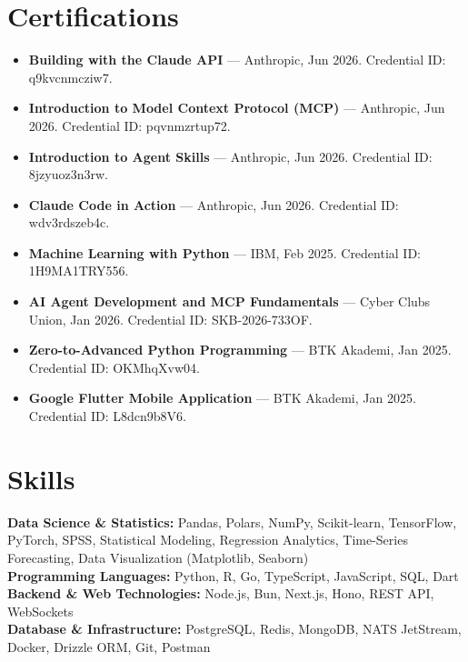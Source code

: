\documentclass[10pt,a4paper]{extarticle}
\begin{document}
\section{Certifications}
\begin{itemize}[leftmargin=*,noitemsep,topsep=2pt]
    \item \textbf{Building with the Claude API} --- Anthropic, Jun 2026. Credential ID: q9kvcnmcziw7.
    \item \textbf{Introduction to Model Context Protocol (MCP)} --- Anthropic, Jun 2026. Credential ID: pqvnmzrtup72.
    \item \textbf{Introduction to Agent Skills} --- Anthropic, Jun 2026. Credential ID: 8jzyuoz3n3rw.
    \item \textbf{Claude Code in Action} --- Anthropic, Jun 2026. Credential ID: wdv3rdszeb4c.
    \item \textbf{Machine Learning with Python} --- IBM, Feb 2025. Credential ID: 1H9MA1TRY556.
    \item \textbf{AI Agent Development and MCP Fundamentals} --- Cyber Clubs Union, Jan 2026. Credential ID: SKB-2026-733OF.
    \item \textbf{Zero-to-Advanced Python Programming} --- BTK Akademi, Jan 2025. Credential ID: OKMhqXvw04.
    \item \textbf{Google Flutter Mobile Application} --- BTK Akademi, Jan 2025. Credential ID: L8dcn9b8V6.
\end{itemize}

\section{Skills}
\textbf{Data Science \& Statistics:} Pandas, Polars, NumPy, Scikit-learn, TensorFlow, PyTorch, SPSS, Statistical Modeling, Regression Analytics, Time-Series Forecasting, Data Visualization (Matplotlib, Seaborn) \\
\textbf{Programming Languages:} Python, R, Go, TypeScript, JavaScript, SQL, Dart \\
\textbf{Backend \& Web Technologies:} Node.js, Bun, Next.js, Hono, REST API, WebSockets \\
\textbf{Database \& Infrastructure:} PostgreSQL, Redis, MongoDB, NATS JetStream, Docker, Drizzle ORM, Git, Postman
\end{document}
